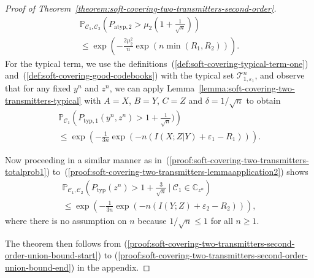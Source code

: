 \documentclass[journal]{IEEEtran}
\newcommand{\lemmaconst}{\delta}
\newcommand{\generalrvOne}{A}
\newcommand{\generalrvTwo}{B}
\newcommand{\generalrvThree}{C}
\newcommand{\codebookRateOne}{R_1}
\newcommand{\codebookRateTwo}{R_2}
\newcommand{\channelInOne}{X}
\newcommand{\channelInTwo}{Y}
\newcommand{\channelInTwoAlphElement}{y}
\newcommand{\channelOut}{Z}
\newcommand{\channelOutAlphElement}{z}
\newcommand{\codebookOne}{\mathcal{C}_1}
\newcommand{\codebookTwo}{\mathcal{C}_2}
\newcommand{\codebookSet}{\mathbb{C}}
\newcommand{\codebookBlocklength}{n}
\newcommand{\mutualInformation}[2]{I(#1;#2)}
\newcommand{\mutualInformationConditional}[3]{I(#1;#2|#3)}
\newcommand{\Probability}{\mathbb{P}}
\newcommand{\typicalityParam}{\varepsilon}
\newcommand{\typicalSetIndex}[3]{\mathcal{T}_{#3,#1}^{#2}}
\newcommand{\secondOrderAtypicalProbability}[1]{\mu_{#1}}
\newcommand{\totvarAtypicalTwo}{P_{\mathrm{atyp}, 2}}
\newcommand{\totvarTypical}[1]{P_{\mathrm{typ}}({#1})}
\newcommand{\totvarTypicalOne}[2]{P_{\mathrm{typ}, 1}({#1},{#2})}
\begin{document}
\begin{proof}[Proof of Theorem~\ref{theorem:soft-covering-two-transmitters-second-order}]
\begin{multline}
\label{proof:soft-covering-two-transmitters-second-order-atypical-bound-2}
\Probability_{\codebookOne, \codebookTwo}\left(
  \totvarAtypicalTwo
  >
  \secondOrderAtypicalProbability{2}\left(
    1+\frac{1}{\sqrt{\codebookBlocklength}}
  \right)
\right)
\\
\leq
\exp\left(
  -\frac{2\secondOrderAtypicalProbability{2}^2}
        {\codebookBlocklength}
  \exp(\codebookBlocklength \min(\codebookRateOne,\codebookRateTwo))
\right).
\end{multline}
For the typical term, we use the definitions~(\ref{def:soft-covering-typical-term-one}) and~(\ref{def:soft-covering-good-codebooks}) with the typical set $\typicalSetIndex{\typicalityParam_1}{\codebookBlocklength}{1}$, and observe that for any fixed $\channelInTwoAlphElement^\codebookBlocklength$ and $\channelOutAlphElement^\codebookBlocklength$, we can apply Lemma~\ref{lemma:soft-covering-two-transmitters-typical} with $\generalrvOne=\channelInOne$, $\generalrvTwo=\channelInTwo$, $\generalrvThree=\channelOut$ and $\lemmaconst=1/\sqrt{\codebookBlocklength}$ to obtain
\begin{multline}
\label{proof:soft-covering-two-transmitters-second-order-typical-bound}
\Probability_{\codebookOne}\left(
  \totvarTypicalOne{\channelInTwoAlphElement^\codebookBlocklength}{\channelOutAlphElement^\codebookBlocklength}
  >
  1 + \frac{1}{\sqrt{\codebookBlocklength}})
\right) \\
\leq
\exp\left(
  -\frac{1}{3\codebookBlocklength} \exp(-\codebookBlocklength (\mutualInformationConditional{\channelInOne}{\channelOut}{\channelInTwo} + \typicalityParam_1 - \codebookRateOne))
\right).
\end{multline}

Now proceeding in a similar manner as in~(\ref{proof:soft-covering-two-transmitters-totalprob1}) to~(\ref{proof:soft-covering-two-transmitters-lemmaapplication2}) shows
\begin{multline*}
\Probability_{\codebookOne, \codebookTwo}\left(
  \totvarTypical{\channelOutAlphElement^\codebookBlocklength}
  >
  1 + \frac{3}{\sqrt{\codebookBlocklength}}
  ~|~
  \codebookOne \in \codebookSet_{\channelOutAlphElement^\codebookBlocklength}
\right)
\\
\leq
\exp\left(
  -\frac{1}{3\codebookBlocklength} \exp(-\codebookBlocklength (\mutualInformation{\channelInTwo}{\channelOut} + \typicalityParam_2 - \codebookRateTwo))
\right),
\end{multline*}
where there is no assumption on $\codebookBlocklength$ because $1/\sqrt{\codebookBlocklength} \leq 1$ for all $\codebookBlocklength \geq 1$.

The theorem then follows from (\ref{proof:soft-covering-two-transmitters-second-order-union-bound-start}) to (\ref{proof:soft-covering-two-transmitters-second-order-union-bound-end}) in the appendix.
\end{proof}
\end{document}
